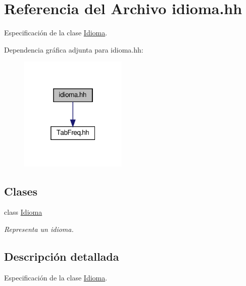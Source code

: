 \hypertarget{idioma_8hh}{}\section{Referencia del Archivo idioma.\+hh}
\label{idioma_8hh}


Especificación de la clase \hyperlink{class_idioma}{Idioma}.  


Dependencia gráfica adjunta para idioma.\+hh\+:
\nopagebreak
\begin{figure}[H]
\begin{center}
\leavevmode
\includegraphics[width=145pt]{idioma_8hh__incl}
\end{center}
\end{figure}
\subsection*{Clases}
\begin{DoxyCompactItemize}
\item 
class \hyperlink{class_idioma}{Idioma}
\begin{DoxyCompactList}\small\item\em Representa un idioma. \end{DoxyCompactList}\end{DoxyCompactItemize}


\subsection{Descripción detallada}
Especificación de la clase \hyperlink{class_idioma}{Idioma}. 

